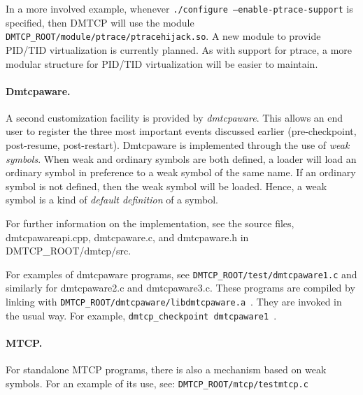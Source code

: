 \documentclass{article}
\begin{document}
In a more involved example, whenever {\tt ./configure
--enable-ptrace-support} is specified, then DMTCP will use the module
{\tt DMTCP\_ROOT/module/ptrace/ptracehijack.so}.  A new module to
provide PID/TID virtualization is currently planned.  As with support
for ptrace, a more modular structure for PID/TID virtualization will be
easier to maintain.

\paragraph{Dmtcpaware.}

A second customization facility is provided by {\em dmtcpaware}.
This allows an end user to register the three most important events
discussed earlier (pre-checkpoint, post-resume, post-restart).
Dmtcpaware is implemented through the use of {\em weak symbols}.
When weak and ordinary symbols are both defined, a loader will
load an ordinary symbol in preference to a weak symbol of the same name.
If an ordinary symbol is not defined, then the weak symbol will
be loaded.  Hence, a weak symbol is a kind of {\em default definition}
of a symbol.

For further information on the implementation, see the source files,
dmtcpawareapi.cpp, dmtcpaware.c, and dmtcpaware.h in DMTCP\_ROOT/dmtcp/src.

For examples of dmtcpaware programs, see
 {\tt DMTCP\_ROOT/test/dmtcpaware1.c} and similarly for dmtcpaware2.c and
dmtcpaware3.c.  These programs are compiled by linking with\hfil\break
{\tt DMTCP\_ROOT/dmtcpaware/libdmtcpaware.a}~.
They are invoked in the usual way.  For example, \newline
{\tt dmtcp\_checkpoint dmtcpaware1}~.


\paragraph{MTCP.}

For standalone MTCP programs, there is also a mechanism based on
weak symbols.  For an example of its use, see:
{\tt DMTCP\_ROOT/mtcp/testmtcp.c}
\end{document}
